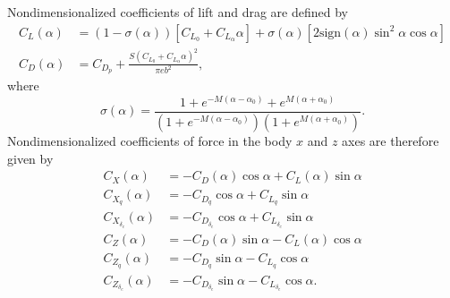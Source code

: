 \documentclass{article}
\begin{document}
\begin{appendices}
Nondimensionalized coefficients of lift and drag are defined by
\begin{align}
C_{L}\left(\alpha\right) & =\left(1-\sigma\left(\alpha\right)\right)\left[C_{L_{0}}+C_{L_{\alpha}}\alpha\right]+\sigma\left(\alpha\right)\left[2\mathrm{sign}\left(\alpha\right)\sin^{2}\alpha\cos\alpha\right]\nonumber\\
C_{D}\left(\alpha\right) & =C_{D_{p}}+\frac{S\left(C_{L_{0}}+C_{L_{\alpha}}\alpha\right)^{2}}{\pi eb^{2}},
\end{align}
where
\begin{equation}
\sigma\left(\alpha\right) =\frac{1+e^{-M\left(\alpha-\alpha_{0}\right)}+e^{M\left(\alpha+\alpha_{0}\right)}}{\left(1+e^{-M\left(\alpha-\alpha_{0}\right)}\right)\left(1+e^{M\left(\alpha+\alpha_{0}\right)}\right)}.
\end{equation}
Nondimensionalized coefficients of force in the body $x$ and $z$ axes are therefore given by
\begin{align}
C_{X}\left(\alpha\right) & =-C_{D}\left(\alpha\right)\cos\alpha+C_{L}\left(\alpha\right)\sin\alpha\\
C_{X_{q}}\left(\alpha\right) & =-C_{D_{q}}\cos\alpha+C_{L_{q}}\sin\alpha\\
C_{X_{\delta_{e}}}\left(\alpha\right) & =-C_{D_{\delta_{e}}}\cos\alpha+C_{L_{\delta_{e}}}\sin\alpha\\
C_{Z}\left(\alpha\right) & =-C_{D}\left(\alpha\right)\sin\alpha-C_{L}\left(\alpha\right)\cos\alpha\\
C_{Z_{q}}\left(\alpha\right) & =-C_{D_{q}}\sin\alpha-C_{L_{q}}\cos\alpha\\
C_{Z_{\delta_{e}}}\left(\alpha\right) & =-C_{D_{\delta_{e}}}\sin\alpha-C_{L_{\delta_{e}}}\cos\alpha.
\end{align}


\end{appendices}
\end{document}
